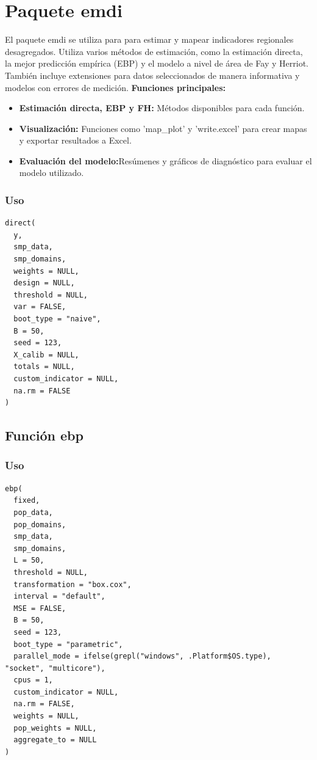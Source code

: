 \documentclass[12pt,spanish]{article}
\begin{document}
\section*{Paquete emdi}

El paquete emdi se utiliza para para estimar y mapear indicadores regionales desagregados. Utiliza varios métodos de estimación, como la estimación directa, la mejor predicción empírica (EBP) y el modelo a nivel de área de Fay y Herriot. También incluye extensiones para datos seleccionados de manera informativa y modelos con errores de medición.
\textbf{Funciones principales:}
\begin{itemize}
    \item \textbf{Estimación directa, EBP y FH:} Métodos disponibles para cada función.
    \item \textbf{Visualización:} Funciones como 'map\_plot' y 'write.excel' para crear mapas y exportar resultados a Excel.
    \item \textbf{Evaluación del modelo:}Resúmenes y gráficos de diagnóstico para evaluar el modelo utilizado.
\end{itemize}

\subsubsection*{Uso}
\begin{verbatim}
direct(
  y,
  smp_data,
  smp_domains,
  weights = NULL,
  design = NULL,
  threshold = NULL,
  var = FALSE,
  boot_type = "naive",
  B = 50,
  seed = 123,
  X_calib = NULL,
  totals = NULL,
  custom_indicator = NULL,
  na.rm = FALSE
)
\end{verbatim}


\subsection*{Función ebp}

\subsubsection*{Uso}
\begin{verbatim}
ebp(
  fixed,
  pop_data,
  pop_domains,
  smp_data,
  smp_domains,
  L = 50,
  threshold = NULL,
  transformation = "box.cox",
  interval = "default",
  MSE = FALSE,
  B = 50,
  seed = 123,
  boot_type = "parametric",
  parallel_mode = ifelse(grepl("windows", .Platform$OS.type), "socket", "multicore"),
  cpus = 1,
  custom_indicator = NULL,
  na.rm = FALSE,
  weights = NULL,
  pop_weights = NULL,
  aggregate_to = NULL
)
\end{verbatim}
\end{document}
